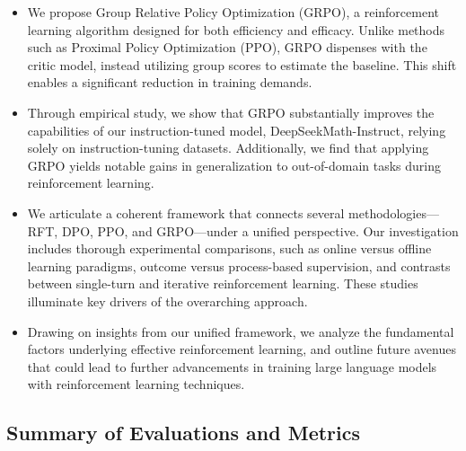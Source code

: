 \begin{itemize}[topsep=0pt]
    \item We propose Group Relative Policy Optimization (GRPO), a reinforcement learning algorithm designed for both efficiency and efficacy. Unlike methods such as Proximal Policy Optimization (PPO), GRPO dispenses with the critic model, instead utilizing group scores to estimate the baseline. This shift enables a significant reduction in training demands.
    \item Through empirical study, we show that GRPO substantially improves the capabilities of our instruction-tuned model, DeepSeekMath-Instruct, relying solely on instruction-tuning datasets. Additionally, we find that applying GRPO yields notable gains in generalization to out-of-domain tasks during reinforcement learning.
    \item We articulate a coherent framework that connects several methodologies—RFT, DPO, PPO, and GRPO—under a unified perspective. Our investigation includes thorough experimental comparisons, such as online versus offline learning paradigms, outcome versus process-based supervision, and contrasts between single-turn and iterative reinforcement learning. These studies illuminate key drivers of the overarching approach.
    \item Drawing on insights from our unified framework, we analyze the fundamental factors underlying effective reinforcement learning, and outline future avenues that could lead to further advancements in training large language models with reinforcement learning techniques.
\end{itemize}

\subsection{Summary of Evaluations and Metrics}

